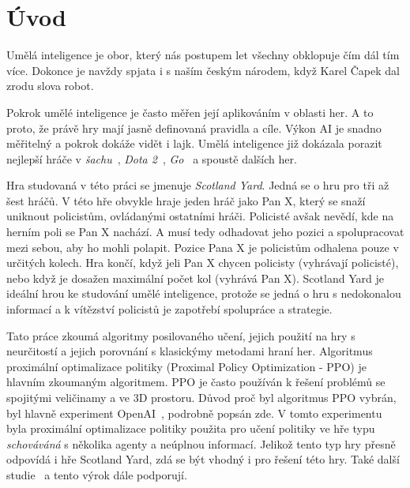 
%

\newtheorem{definition}{\textbf{Definice}}

\chapter{Úvod}
\label{ch:uvod}

Umělá inteligence je obor, který nás postupem let všechny obklopuje čím dál tím více.
Dokonce je navždy spjata i s naším českým národem, když Karel Čapek dal zrodu slova robot.

Pokrok umělé inteligence je často měřen její aplikováním v oblasti her.
A to proto, že právě hry mají jasně definovaná pravidla a cíle.
Výkon AI je snadno měřitelný a pokrok dokáže vidět i lajk.
Umělá inteligence již dokázala porazit nejlepší hráče v \textit{šachu}~\cite{DeepBlue}, \textit{Dota 2}~\cite{Dota2}, \textit{Go}~\cite{AlphaGo} a spoustě dalších her.

Hra studovaná v této práci se jmenuje \emph{Scotland Yard}.
Jedná se o hru pro tři až šest hráčů.
V této hře obvykle hraje jeden hráč jako Pan X, který se snaží uniknout policistům, ovládanými ostatními hráči.
Policisté avšak nevědí, kde na herním poli se Pan X nachází.
A musí tedy odhadovat jeho pozici a spolupracovat mezi sebou, aby ho mohli polapit.
Pozice Pana X je policistům odhalena pouze v určitých kolech.
Hra končí, když jeli Pan X chycen policisty (vyhrávají policisté), nebo když je dosažen maximální počet kol (vyhrává Pan X).
Scotland Yard je ideální hrou ke studování umělé inteligence, protože se jedná o hru s nedokonalou informací a k vítězství policistů je zapotřebí spolupráce a strategie.

Tato práce zkoumá algoritmy posilovaného učení, jejich použití na hry s neurčitostí a jejich porovnání s klasickýmy metodami hraní her.
Algoritmus proximální optimalizace politiky (Proximal Policy Optimization - PPO) je hlavním zkoumaným algoritmem.
PPO je často používán k řešení problémů se spojitými veličinamy a ve 3D prostoru.
Důvod proč byl algoritmus PPO vybrán, byl hlavně experiment OpenAI~\cite{PPO_Hide_Seek_page}, podrobně popsán zde\cite{PPO_Hide_Seek_paper}.
V tomto experimentu byla proximální optimalizace politiky použita pro učení politiky ve hře typu \textit{schováváná} s několika agenty a neúplnou informací.
Jelikož tento typ hry přesně odpovídá i hře Scotland Yard, zdá se být vhodný i pro řešení této hry.
Také další studie~\cite{Manille} a \cite{Dota2} tento výrok dále podporují.

